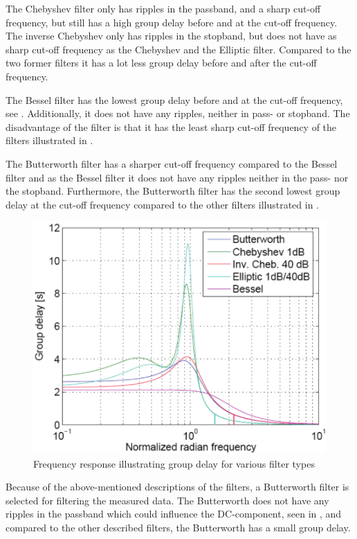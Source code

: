 The Chebyshev filter only has ripples in the passband, and a sharp cut-off frequency, but still has a high group delay before and at the cut-off frequency. The inverse Chebyshev only has ripples in the stopband, but does not have as sharp cut-off frequency as the Chebyshev and the Elliptic filter. Compared to the two former filters it has a lot less group delay before and after the cut-off frequency.

The Bessel filter has the lowest group delay before and at the cut-off frequency, see . Additionally, it does not have any ripples, neither in pass- or stopband. The disadvantage of the filter is that it has the least sharp cut-off frequency of the filters illustrated in .

The Butterworth filter has a sharper cut-off frequency compared to the Bessel filter and as the Bessel filter it does not have any ripples neither in the pass- nor the stopband. Furthermore, the Butterworth filter has the second lowest group delay at the cut-off frequency compared to the other filters illustrated in . 

\begin{figure}[H]
	\centering
	\includegraphics[scale=0.7]{figures/Filtertypes2.pdf}
	\caption{Frequency response illustrating group delay for various filter types}
	\label{fig:groupdelay}
\end{figure}

Because of the above-mentioned descriptions of the filters, a Butterworth filter is selected for filtering the measured data. The Butterworth does not have any ripples in the passband which could influence the DC-component, seen in , and compared to the other described filters, the Butterworth has a small group delay.

